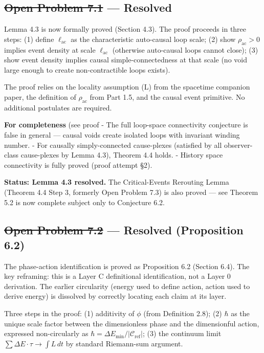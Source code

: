 \documentclass[11pt]{article}
\theoremstyle{definition}
\theoremstyle{remark}
\begin{document}
\subsection{\texorpdfstring{\st{Open Problem 7.1} ---
Resolved}{Open Problem 7.1 --- Resolved}}\label{open-problem-7.1-resolved}

Lemma 4.3 is now formally proved (Section 4.3). The proof proceeds in
three steps: (1) define \(\ell_{\mathrm{ac}}\) as the characteristic
auto-causal loop scale; (2) show \(\rho_{\mathrm{ac}} > 0\) implies
event density at scale \(\ell_{\mathrm{ac}}\) (otherwise auto-causal
loops cannot close); (3) show event density implies causal
simple-connectedness at that scale (no void large enough to create
non-contractible loops exists).

The proof relies on the locality assumption (L) from the spacetime
companion paper, the definition of \(\rho_{\mathrm{ac}}\) from Part 1.5,
and the causal event primitive. No additional postulates are required.

\textbf{For completeness} (see proof
- The full loop-space connectivity conjecture is false in general ---
causal voids create isolated loops with invariant winding number. - For
causally simply-connected cause-plexes (satisfied by all observer-class
cause-plexes by Lemma 4.3), Theorem 4.4 holds. - History space
connectivity is fully proved (proof attempt §2).

\textbf{Status: Lemma 4.3 resolved.} The Critical-Events Rerouting Lemma
(Theorem 4.4 Step 3, formerly Open Problem 7.3) is also proved --- see
Theorem 5.2 is now complete subject only to Conjecture 6.2.

\medskip

\subsection{\texorpdfstring{\st{Open Problem 7.2} --- Resolved
(Proposition
6.2)}{Open Problem 7.2 --- Resolved (Proposition 6.2)}}\label{open-problem-7.2-resolved-proposition-6.2}

The phase-action identification is proved as Proposition 6.2 (Section
6.4). The key reframing: this is a Layer C definitional identification,
not a Layer 0 derivation. The earlier circularity (energy used to define
action, action used to derive energy) is dissolved by correctly locating
each claim at its layer.

Three steps in the proof: (1) additivity of \(\phi\) (from Definition
2.8); (2) \(\hbar\) as the unique scale factor between the dimensionless
phase and the dimensionful action, expressed non-circularly as
\(\hbar = \Delta E_{\min}/|\mathcal{C}_{\text{ref}}|\); (3) the
continuum limit \(\sum \Delta E \cdot \tau \to \int L\,dt\) by standard
Riemann-sum argument.
\end{document}
